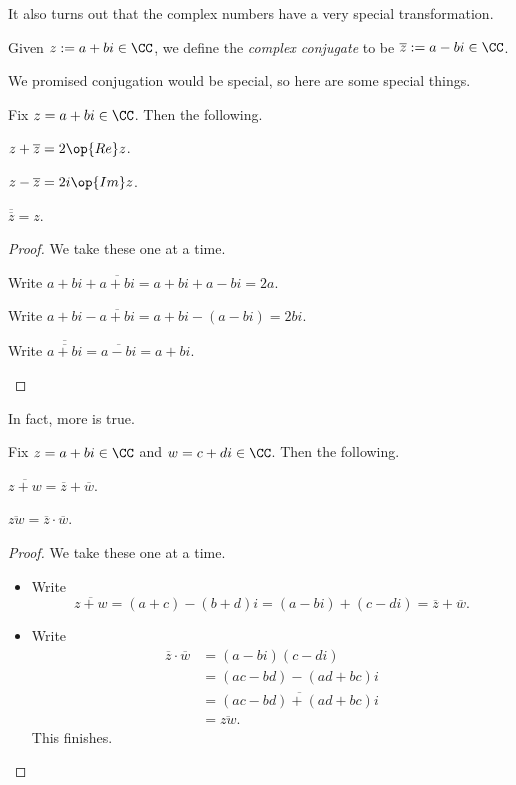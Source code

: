 It also turns out that the complex numbers have a very special transformation.
\begin{definition}[Conjugate]
	Given $z:=a+bi\in\CC$, we define the \textit{complex conjugate} to be $\overline z:=a-bi\in\CC$.
\end{definition}
We promised conjugation would be special, so here are some special things.
\begin{proposition} \label{prop:accessreandim}
	Fix $z=a+bi\in\CC$. Then the following.
	\begin{listalph}
		\item $z+\overline z=2\op{Re}z$.
		\item $z-\overline z=2i\op{Im}z$.
		\item $\overline{\overline z}=z$.
	\end{listalph}
\end{proposition}
\begin{proof}
	We take these one at a time.
	\begin{listalph}
		\item Write $a+bi+\overline{a+bi}=a+bi+a-bi=2a$.
		\item Write $a+bi-\overline{a+bi}=a+bi-(a-bi)=2bi$.
		\item Write $\overline{\overline{a+bi}}=\overline{a-bi}=a+bi$.
		\qedhere
	\end{listalph}
\end{proof}
In fact, more is true.
\begin{proposition}
	Fix $z=a+bi\in\CC$ and $w=c+di\in\CC$. Then the following.
	\begin{listalph}
		\item $\overline{z+w}=\overline z+\overline w$.
		\item $\overline{zw}=\overline z\cdot\overline w$.
	\end{listalph}
\end{proposition}
\begin{proof}
	We take these one at a time.
	\begin{itemize}
		\item Write
		\[\overline{z+w}=(a+c)-(b+d)i=(a-bi)+(c-di)=\overline z+\overline w.\]
		\item Write
		\begin{align*}
			\overline z\cdot\overline w &= (a-bi)(c-di) \\
			&= (ac-bd)-(ad+bc)i \\
			&= \overline{(ac-bd)+(ad+bc)i} \\
			&= \overline{zw}.
		\end{align*}
		This finishes.
		\qedhere
	\end{itemize}
\end{proof}

